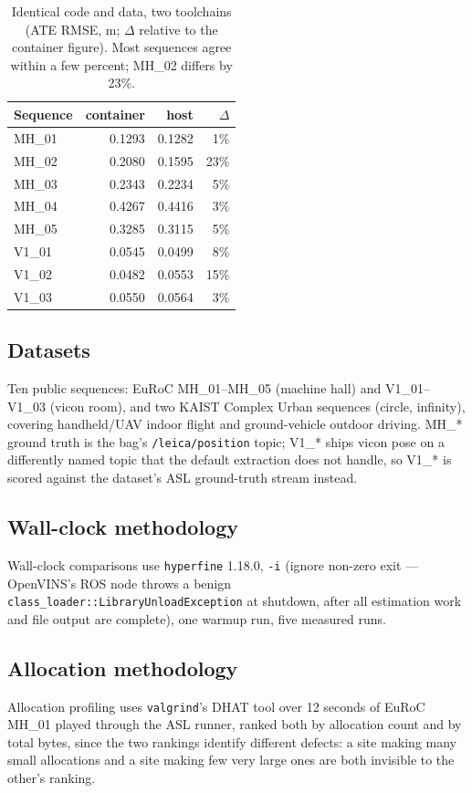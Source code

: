 \documentclass[10pt,conference,letterpaper]{IEEEtran}
\begin{document}
\begin{table}[t]
\caption{Identical code and data, two toolchains (ATE RMSE, m;
$\Delta$ relative to the container figure). Most
sequences agree within a few percent; MH\_02 differs by 23\%.}
\label{tab:toolchain}
\centering
\begin{tabular}{lrrr}
\toprule
Sequence & container & host & $\Delta$ \\
\midrule
MH\_01 & 0.1293 & 0.1282 & 1\% \\
MH\_02 & 0.2080 & 0.1595 & 23\% \\
MH\_03 & 0.2343 & 0.2234 & 5\% \\
MH\_04 & 0.4267 & 0.4416 & 3\% \\
MH\_05 & 0.3285 & 0.3115 & 5\% \\
V1\_01 & 0.0545 & 0.0499 & 8\% \\
V1\_02 & 0.0482 & 0.0553 & 15\% \\
V1\_03 & 0.0550 & 0.0564 & 3\% \\
\bottomrule
\end{tabular}
\end{table}

\subsection{Datasets}
Ten public sequences: EuRoC MH\_01--MH\_05 (machine hall) and V1\_01--V1\_03
(vicon room), and two KAIST Complex Urban sequences (circle, infinity),
covering handheld/UAV indoor flight and ground-vehicle outdoor driving.
MH\_* ground truth is the bag's \texttt{/leica/position} topic; V1\_*
ships vicon pose on a differently named topic that the default extraction
does not handle, so V1\_* is scored against the dataset's ASL ground-truth
stream instead.

\subsection{Wall-clock methodology}
Wall-clock comparisons use \texttt{hyperfine} 1.18.0, \texttt{-i} (ignore
non-zero exit --- OpenVINS's ROS node throws a benign
\texttt{class\_loader::LibraryUnloadException} at shutdown, after all
estimation work and file output are complete), one warmup run, five
measured runs.

\subsection{Allocation methodology}
Allocation profiling uses \texttt{valgrind}'s DHAT tool over 12 seconds of
EuRoC MH\_01 played through the ASL runner, ranked both by allocation count
and by total bytes, since the two rankings identify different defects: a
site making many small allocations and a site making few very large ones are
both invisible to the other's ranking.
\end{document}
